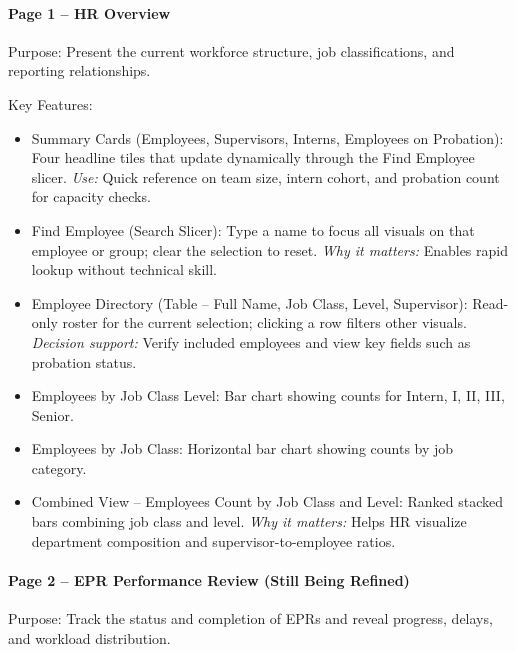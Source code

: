\documentclass[12pt]{article}
\def\textbf#1{#1}%
\begin{document}
\paragraph{Page 1 – HR Overview}
\textbf{Purpose:} Present the current workforce structure, job classifications, and reporting relationships.

\textbf{Key Features:}
\begin{itemize}[nosep]
  \item \textbf{Summary Cards (Employees, Supervisors, Interns, Employees on Probation):}
        Four headline tiles that update dynamically through the Find Employee slicer.  
        \emph{Use:} Quick reference on team size, intern cohort, and probation count for capacity checks.
  \item \textbf{Find Employee (Search Slicer):}
        Type a name to focus all visuals on that employee or group; clear the selection to reset.  
        \emph{Why it matters:} Enables rapid lookup without technical skill.
  \item \textbf{Employee Directory (Table – Full Name, Job Class, Level, Supervisor):}
        Read-only roster for the current selection; clicking a row filters other visuals.  
        \emph{Decision support:} Verify included employees and view key fields such as probation status.
  \item \textbf{Employees by Job Class Level:}
        Bar chart showing counts for Intern, I, II, III, Senior.
  \item \textbf{Employees by Job Class:}
        Horizontal bar chart showing counts by job category.
  \item \textbf{Combined View – Employees Count by Job Class and Level:}
        Ranked stacked bars combining job class and level.  
        \emph{Why it matters:} Helps HR visualize department composition and supervisor-to-employee ratios.
\end{itemize}

\paragraph{Page 2 – EPR Performance Review (Still Being Refined)}
\textbf{Purpose:} Track the status and completion of EPRs and reveal progress, delays, and workload distribution.
\end{document}
